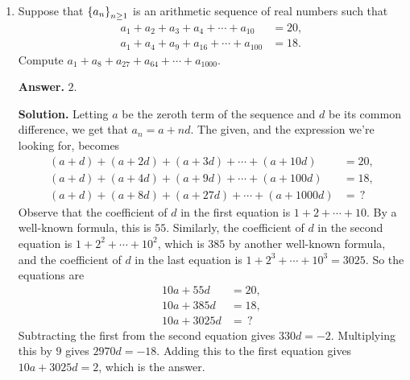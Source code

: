 \documentclass[11pt,paper=letter]{scrartcl}
\begin{document}
\begin{enumerate}[left=0pt]
{\sffamily \bfseries Solution 2.} It is possible to find $x$ without observing that $OFAD$ is a square or triangle $ABC$ is right. We proceed after the second paragraph in the solution above.

We can compute the area of the triangle in two ways: through the formula $rs$, where $r$ is the inradius and $s$ is the semiperimeter, or through Heron's formula $\sqrt{s(s-a)(s-b)(s-c)}$, where $a$, $b$, and $c$ are the side lengths. We can solve for $s = x + 12$, and equating them gives
\begin{align*}
  rs &= \sqrt{s(s-a)(s-b)(s-c)} \\
  4(x + 12) &= \sqrt{(x + 12)(x)(4)(8)} \\
  16(x + 12)^2 &= 32x(x + 12),
\end{align*}
and hence $x = 12$. Again by Heron's formula we get the area as $96$.

\item Suppose that $\left\{ a_n \right\}_{n \geq 1}$ is an arithmetic sequence of real numbers such that \begin{align*}
  a_1 + a_2 + a_3 + a_4 + \cdots + a_{10} &= 20,\\
  a_1 + a_4 + a_9 + a_{16} + \cdots + a_{100} &= 18.
\end{align*}
Compute $a_1 + a_8 + a_{27} + a_{64} + \cdots + a_{1000}$.

{\sffamily \bfseries Answer.} $\boxed{2}$.

{\sffamily \bfseries Solution.} Letting $a$ be the zeroth term of the sequence and $d$ be its common difference, we get that $a_n = a + nd$. The given, and the expression we're looking for, becomes \begin{align*}
  (a + d) + (a + 2d) + (a + 3d) + \cdots + (a + 10d) &= 20,\\
  (a + d) + (a + 4d) + (a + 9d) + \cdots + (a + 100d) &= 18,\\
  (a + d) + (a + 8d) + (a + 27d) + \cdots + (a + 1000d) &= \, ?
\end{align*}
Observe that the coefficient of $d$ in the first equation is $1 + 2 + \cdots + 10$. By a well-known formula, this is $55$. Similarly, the coefficient of $d$ in the second equation is $1 + 2^2 + \cdots + 10^2$, which is $385$ by another well-known formula, and the coefficient of $d$ in the last equation is $1 + 2^3 + \cdots + 10^3 = 3025$. So the equations are \begin{align*}
  10a + 55d &= 20,\\
  10a + 385d &= 18,\\
  10a + 3025d &= \, ?
\end{align*}
Subtracting the first from the second equation gives $330d = -2$. Multiplying this by $9$ gives $2970d = -18$. Adding this to the first equation gives $10a + 3025d = 2$, which is the answer.


\end{enumerate}
\end{document}
